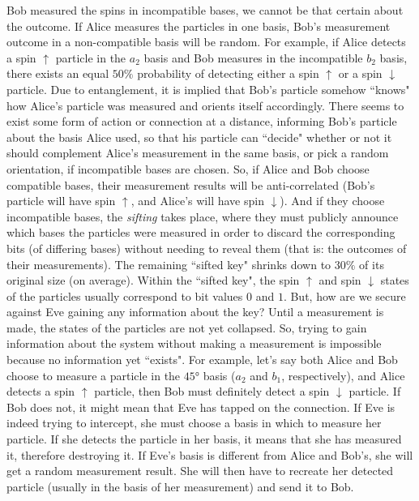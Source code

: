 Bob measured the spins in incompatible bases, we cannot be that certain about the
outcome. If Alice measures the particles in one basis, Bob's measurement outcome in a
non-compatible basis will be random. For example, if Alice detects a spin $\bm{\uparrow}$ particle in the $a_{2}$ basis 
and Bob measures in the incompatible $b_{2}$ basis, there exists an equal $50\%$ probability of detecting either 
a spin $\bm{\uparrow}$ or a spin $\bm{\downarrow}$ particle.
Due to entanglement, it is implied that Bob's particle somehow ``knows" how Alice's particle was measured 
and orients itself accordingly. There seems to exist some form of action or
connection at a distance, informing Bob's particle about the basis Alice used, so that his
particle can ``decide" whether or not it should complement Alice's measurement in the same
basis, or pick a random orientation, if incompatible bases are chosen.
So, if Alice and Bob choose compatible bases, their measurement results will be anti-correlated 
(Bob's particle will have spin $\bm{\uparrow}$, and Alice's will have spin $\bm{\downarrow}$). 
And if they choose incompatible bases, the {\it sifting} takes place, where they must publicly
announce which bases the particles were measured in order to discard the corresponding
bits (of differing bases) without needing to reveal them (that is: the outcomes of their measurements).
The remaining ``sifted key" shrinks down to $30\%$ of its original size (on average). 
Within the ``sifted key", the spin $\bm{\uparrow}$ and spin $\bm{\downarrow}$ states of the particles 
usually correspond to bit values $0$ and $1$.
But, how are we secure against Eve gaining any information about the key?
Until a measurement is made, the states of the particles are not yet collapsed.
So, trying to gain information about the system without making a measurement is impossible because 
no information yet ``exists". For example, let's say both Alice and Bob choose to measure a particle
in the $\ang{45}$ basis ($a_{2}$ and $b_{1}$, respectively), and Alice detects a
spin $\bm{\uparrow}$ particle, then Bob must definitely detect a spin $\bm{\downarrow}$ particle. 
If Bob does not, it might mean that Eve has tapped on the connection. If Eve is indeed trying to intercept, she must
choose a basis in which to measure her particle. If she detects the particle in her basis, it
means that she has measured it, therefore destroying it. If Eve's basis is different from Alice and Bob's, 
she will get a random measurement result. She will then have to recreate her detected particle 
(usually in the basis of her measurement) and send it to Bob.
